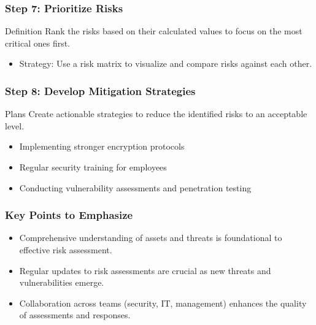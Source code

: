 \documentclass{beamer}
\begin{document}
\begin{frame}[fragile]
    \frametitle{Step 7: Prioritize Risks}
    \begin{block}{Definition}
        Rank the risks based on their calculated values to focus on the most critical ones first.
    \end{block}
    \begin{itemize}
        \item Strategy: Use a risk matrix to visualize and compare risks against each other.
    \end{itemize}
\end{frame}

\begin{frame}[fragile]
    \frametitle{Step 8: Develop Mitigation Strategies}
    \begin{block}{Plans}
        Create actionable strategies to reduce the identified risks to an acceptable level.
    \end{block}
    \begin{itemize}
        \item Implementing stronger encryption protocols
        \item Regular security training for employees
        \item Conducting vulnerability assessments and penetration testing
    \end{itemize}
\end{frame}

\begin{frame}[fragile]
    \frametitle{Key Points to Emphasize}
    \begin{itemize}
        \item Comprehensive understanding of assets and threats is foundational to effective risk assessment.
        \item Regular updates to risk assessments are crucial as new threats and vulnerabilities emerge.
        \item Collaboration across teams (security, IT, management) enhances the quality of assessments and responses.
    \end{itemize}
\end{frame}
\end{document}
